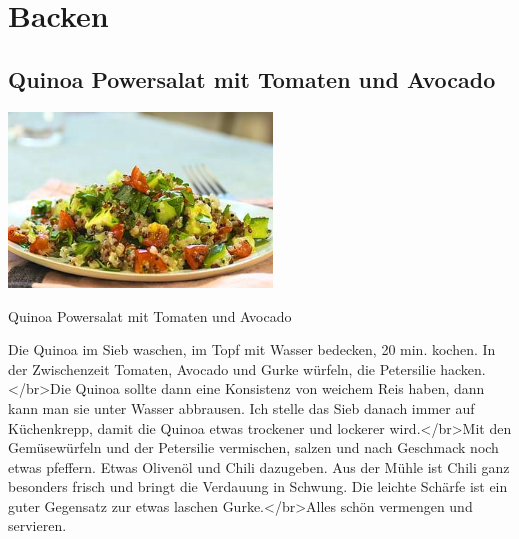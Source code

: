 \documentclass[12pt]{book}
\begin{document}
  \chapter{Backen}
\begin{mytextbox}
\end{mytextbox}
\newpage
	\begin{multicols}{2}
\begin{mytextbox}
  \section{Quinoa Powersalat mit Tomaten und Avocado}



  \begin{center}
    \includegraphics[width=7cm]{225e83e76406364e3344e417b312c16b}
  \end{center}


  \begin{center}
    Quinoa Powersalat mit Tomaten und Avocado
  \end{center}

  Die Quinoa im Sieb waschen, im Topf mit Wasser bedecken, 20 min. kochen. In der Zwischenzeit Tomaten, Avocado und Gurke würfeln, die Petersilie hacken.</br>Die Quinoa sollte dann eine Konsistenz von weichem Reis haben, dann kann man sie unter Wasser abbrausen. Ich stelle das Sieb danach immer auf Küchenkrepp, damit die Quinoa etwas trockener und lockerer wird.</br>Mit den Gemüsewürfeln und der Petersilie vermischen, salzen und nach Geschmack noch etwas pfeffern. Etwas Olivenöl und Chili dazugeben. Aus der Mühle ist Chili ganz besonders frisch und bringt die Verdauung in Schwung. Die leichte Schärfe ist ein guter Gegensatz zur etwas laschen Gurke.</br>Alles schön vermengen und servieren.

\end{mytextbox}\begin{mytextbox}

\end{mytextbox}
\end{multicols}
\end{document}
